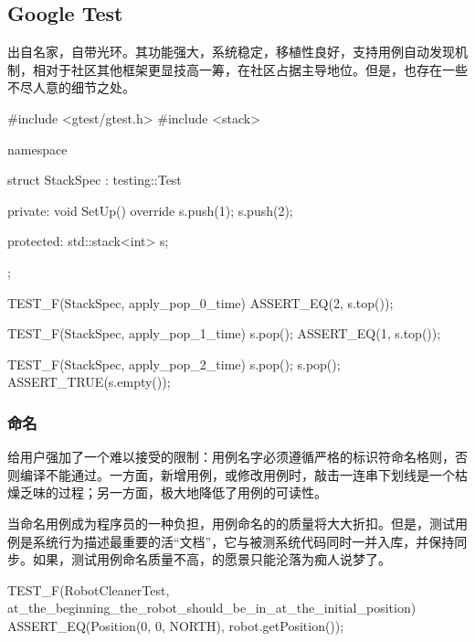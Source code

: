 \begin{content}

\subsection{Google Test}

出自名家，自带光环。其功能强大，系统稳定，移植性良好，支持用例自动发现机制，相对于社区其他框架更显技高一筹，在社区占据主导地位。但是，也存在一些不尽人意的细节之处。

\begin{leftbar}
 \begin{c++}
#include <gtest/gtest.h>
#include <stack>

namespace {
  struct StackSpec : testing::Test {
  private:
    void SetUp() override {
      s.push(1);
      s.push(2);
    }

  protected:
    std::stack<int> s;
  };
}

TEST_F(StackSpec, apply_pop_0_time) {
  ASSERT_EQ(2, s.top());
}

TEST_F(StackSpec, apply_pop_1_time) {
  s.pop();
  ASSERT_EQ(1, s.top());
}

TEST_F(StackSpec, apply_pop_2_time) {
  s.pop();
  s.pop();
  ASSERT_TRUE(s.empty());
}
 \end{c++}
\end{leftbar}

\subsubsection{命名}

给用户强加了一个难以接受的限制：用例名字必须遵循严格的标识符命名格则，否则编译不能通过。一方面，新增用例，或修改用例时，敲击一连串下划线是一个枯燥乏味的过程；另一方面，极大地降低了用例的可读性。

当命名用例成为程序员的一种负担，用例命名的的质量将大大折扣。但是，测试用例是系统行为描述最重要的活“文档”，它与被测系统代码同时一并入库，并保持同步。如果，测试用例命名质量不高，的愿景只能沦落为痴人说梦了。

\begin{leftbar}
 \begin{c++}
TEST_F(RobotCleanerTest, at_the_beginning_the_robot_should_be_in_at_the_initial_position) {
  ASSERT_EQ(Position(0, 0, NORTH), robot.getPosition());
}
 \end{c++}
\end{leftbar}


\end{content}
